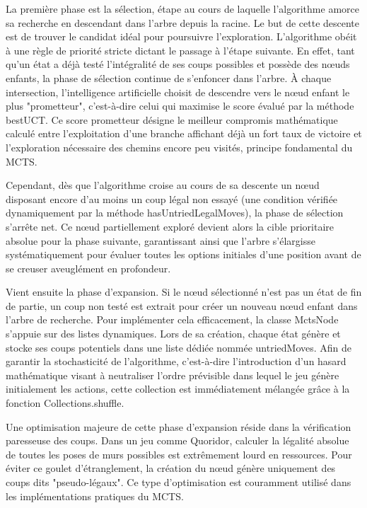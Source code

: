 \documentclass[a4paper]{article}
\begin{document}
La première phase est la sélection, étape au cours de laquelle l'algorithme amorce sa recherche en descendant dans l'arbre depuis la racine. Le but de cette descente est de trouver le candidat idéal pour poursuivre l'exploration. L'algorithme obéit à une règle de priorité stricte dictant le passage à l'étape suivante. En effet, tant qu'un état a déjà testé l'intégralité de ses coups possibles et possède des nœuds enfants, la phase de sélection continue de s'enfoncer dans l'arbre. À chaque intersection, l'intelligence artificielle choisit de descendre vers le nœud enfant le plus "prometteur", c'est-à-dire celui qui maximise le score évalué par la méthode bestUCT. Ce score prometteur désigne le meilleur compromis mathématique calculé entre l'exploitation d'une branche affichant déjà un fort taux de victoire et l'exploration nécessaire des chemins encore peu visités, principe fondamental du MCTS\cite{browne2012mcts}.

Cependant, dès que l'algorithme croise au cours de sa descente un nœud disposant encore d'au moins un coup légal non essayé (une condition vérifiée dynamiquement par la méthode hasUntriedLegalMoves), la phase de sélection s'arrête net. Ce nœud partiellement exploré devient alors la cible prioritaire absolue pour la phase suivante, garantissant ainsi que l'arbre s'élargisse systématiquement pour évaluer toutes les options initiales d'une position avant de se creuser aveuglément en profondeur.

Vient ensuite la phase d'expansion. Si le nœud sélectionné n'est pas un état de fin de partie, un coup non testé est extrait pour créer un nouveau nœud enfant dans l'arbre de recherche. Pour implémenter cela efficacement, la classe MctsNode s'appuie sur des listes dynamiques. Lors de sa création, chaque état génère et stocke ses coups potentiels dans une liste dédiée nommée untriedMoves. Afin de garantir la stochasticité de l'algorithme\label{sec:stochasticite}, c'est-à-dire l'introduction d'un hasard mathématique visant à neutraliser l'ordre prévisible dans lequel le jeu génère initialement les actions, cette collection est immédiatement mélangée grâce à la fonction Collections.shuffle\cite{browne2012mcts}.

Une optimisation majeure de cette phase d'expansion réside dans la vérification paresseuse des coups. Dans un jeu comme Quoridor, calculer la légalité absolue de toutes les poses de murs possibles est extrêmement lourd en ressources. Pour éviter ce goulet d'étranglement, la création du nœud génère uniquement des coups dits "pseudo-légaux". Ce type d’optimisation est couramment utilisé dans les implémentations pratiques du MCTS\cite{browne2012mcts}.
\end{document}
